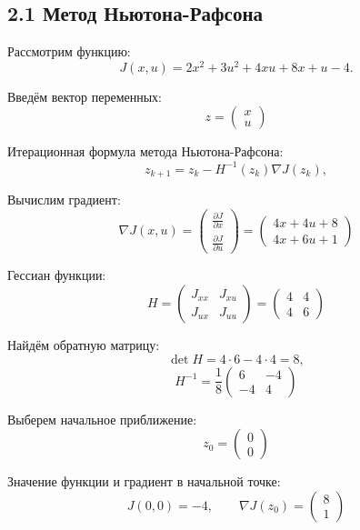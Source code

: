 \subsection*{2.1 Метод Ньютона-Рафсона}

Рассмотрим функцию:
\[
J(x,u)=2x^2+3u^2+4xu+8x+u-4.
\]

Введём вектор переменных:
\[
z=
\begin{pmatrix}
x\\
u
\end{pmatrix}
\]

Итерационная формула метода Ньютона-Рафсона:
\[
z_{k+1}=z_k-H^{-1}(z_k)\nabla J(z_k),
\]

Вычислим градиент:
\[
\nabla J(x,u)=
\begin{pmatrix}
\displaystyle\frac{\partial J}{\partial x}\\[2ex]
\displaystyle\frac{\partial J}{\partial u}
\end{pmatrix}
=
\begin{pmatrix}
4x+4u+8\\
4x+6u+1
\end{pmatrix}
\]

Гессиан функции:
\[
H=
\begin{pmatrix}
J_{xx} & J_{xu}\\
J_{ux} & J_{uu}
\end{pmatrix}
=
\begin{pmatrix}
4 & 4\\
4 & 6
\end{pmatrix}
\]

Найдём обратную матрицу:
\[
\det H=4\cdot6-4\cdot4=8,
\]
\[
H^{-1}=
\frac18
\begin{pmatrix}
6 & -4\\
-4 & 4
\end{pmatrix}
\]

Выберем начальное приближение:
\[
z_0=
\begin{pmatrix}
0\\
0
\end{pmatrix}
\]

Значение функции и градиент в начальной точке:
\[
J(0,0)=-4,
\qquad
\nabla J(z_0)=
\begin{pmatrix}
8\\
1
\end{pmatrix}
\]

